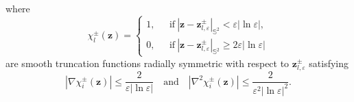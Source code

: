 \documentclass[12pt,reqno]{amsart}
\numberwithin{equation}{section}
\theoremstyle{definition}
\theoremstyle{remark}
\newcommand{\ep}{\varepsilon}
\begin{document}
   where
   \begin{equation*}
   	\chi_l^\pm(\boldsymbol z)=\left\{
   	\begin{array}{lll}
   		1, \ \ \  & \mathrm{if} \ |\boldsymbol z-\boldsymbol z_{l,\varepsilon}^\pm|_{\mathbb S^2}< \varepsilon|\ln\varepsilon|,\\
   		0, & \mathrm{if} \ |\boldsymbol z-\boldsymbol z_{l,\varepsilon}^\pm|_{\mathbb S^2}\ge 2\varepsilon|\ln\varepsilon|
   	\end{array}
   	\right.
   \end{equation*}
   are smooth truncation functions radially symmetric with respect to $\boldsymbol z_{l,\ep}^\pm$ satisfying
   \begin{equation*}
   	|\nabla \chi_i^\pm(\boldsymbol z)|\le \frac{2}{\varepsilon|\ln\varepsilon|} \quad \mathrm{and} \quad |\nabla^2 \chi_i^\pm(\boldsymbol z)|\le \frac{2}{\varepsilon^2|\ln\varepsilon|^2}.
   \end{equation*}
   
\end{document}
